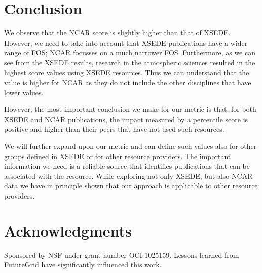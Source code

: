 \documentclass[10pt, conference, compsocconf]{IEEEtran}
\begin{document}
\section{Conclusion} \label{S:conclusion}

We observe that the NCAR score is slightly higher than that of XSEDE. However, we need to take into account that XSEDE publications have a wider range of FOS; NCAR focusses on a much narrower FOS. Furthermore, as we can see from the XSEDE results, research in the atmospheric sciences resulted in the highest score values using XSEDE resources. Thus we can understand that the value is higher for NCAR as they do not include the other disciplines that have lower values.

However, the most important conclusion we make for our metric is that, for both XSEDE and NCAR publications, the impact measured by a percentile score is positive and higher than their peers that have not used such resources. 

We will further expand upon our metric and can define such values also for other groups defined in XSEDE or for other resource providers. The important information we need is a reliable source that identifies publications that can be associated with the resource. While exploring not only XSEDE, but also NCAR data we have in principle shown that our approach is applicable to other resource providers.


\section{Acknowledgments}

Sponsored by NSF under grant number OCI-1025159. Lessons learned from FutureGrid have significantly influenced this work. 
 

%
% 

 
\end{document}
